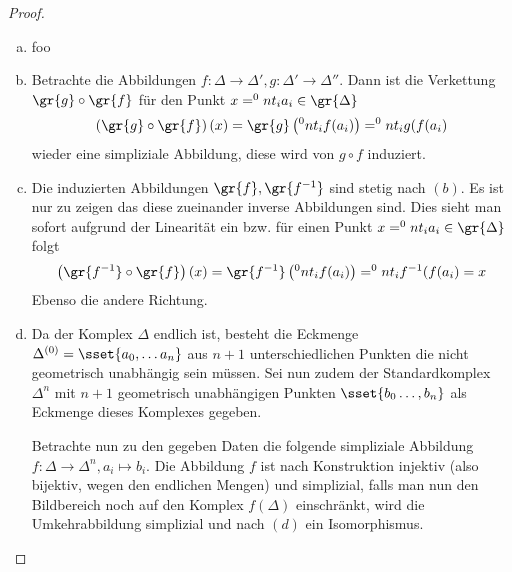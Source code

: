 \begin{Satz}
\begin{proof}
\begin{enumerate}[(a)]
          \item foo
          \item Betrachte die Abbildungen
            $f : \Delta \rightarrow \Delta' , g : \Delta' \rightarrow
            \Delta''$.
            Dann ist die Verkettung $\gr{g} \circ \gr{f}$ für den Punkt
            $x = \sp{0}{n} t_i a_i \in \gr{\Delta}$
            \begin{gather*}
              \left( \gr{g} \circ \gr{f} \right) (x) = \gr{g} \left(
                \sp{0}{n} t_i f(a_i) \right) = \sp{0}{n} t_i g(f(a_i)
            \end{gather*}
            wieder eine simpliziale Abbildung, diese wird von
            $g \circ f$ induziert.
          \item Die induzierten Abbildungen $\gr{f},\gr{f^{-1}}$ sind
            stetig nach $(b)$. Es ist nur zu zeigen das diese
            zueinander inverse Abbildungen sind. Dies sieht man sofort
            aufgrund der Linearität ein bzw. für einen Punkt
            $x = \sp{0}{n} t_i a_i \in \gr{\Delta}$ folgt
            \begin{gather*}
              \left( \gr{f^{-1}} \circ \gr{f} \right) (x) =
              \gr{f^{-1}} \left( \sp{0}{n} t_i f(a_i) \right) =
              \sp{0}{n} t_i f^{-1}(f(a_i) = x
            \end{gather*}
            Ebenso die andere Richtung.
          \item Da der Komplex $\Delta$ endlich ist, besteht die
            Eckmenge $\Delta^{(0)} = \sset{ a_0 , \ldots a_n}$ aus
            $n+1$ unterschiedlichen Punkten die nicht geometrisch
            unabhängig sein müssen. Sei nun zudem der Standardkomplex
            $\Delta^n$ mit $n+1$ geometrisch unabhängigen Punkten
            $\sset{b_0 \ldots , b_n}$ als Eckmenge dieses Komplexes
            gegeben.

            Betrachte nun zu den gegeben Daten die folgende
            simpliziale Abbildung
            $f : \Delta \rightarrow \Delta^n , a_i \mapsto b_i$.  Die
            Abbildung $f$ ist nach Konstruktion injektiv (also
            bijektiv, wegen den endlichen Mengen) und simplizial,
            falls man nun den Bildbereich noch auf den Komplex
            $f(\Delta)$ einschränkt, wird die Umkehrabbildung
            simplizial und nach $(d)$ ein Isomorphismus.
          \end{enumerate}
	\end{proof}
\end{Satz}















